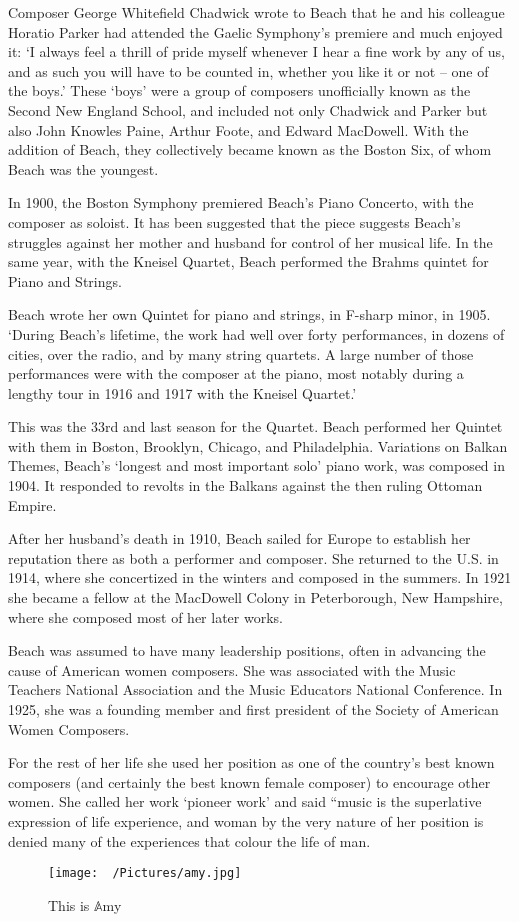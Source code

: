 \documentclass[12pt,a4paper]{article}
\begin{document}
Composer George Whitefield Chadwick wrote to Beach that he and his colleague Horatio Parker had attended the Gaelic Symphony's premiere and much enjoyed it:
`I always feel a thrill of pride myself whenever I hear a fine work by any of us, and as such you will have to be counted in, whether you like it or not – one of the boys.'
These `boys' were a group of composers unofficially known as the Second New England School, and included not only Chadwick and Parker but also John Knowles Paine,
Arthur Foote, and Edward MacDowell. With the addition of Beach, they collectively became known as the Boston Six, of whom Beach was the youngest.

In 1900, the Boston Symphony premiered Beach's Piano Concerto, with the composer as soloist.
It has been suggested that the piece suggests Beach's struggles against her mother and husband for control of her musical life.
In the same year, with the Kneisel Quartet, Beach performed the Brahms quintet for Piano and Strings.

Beach wrote her own Quintet for piano and strings, in F-sharp minor, in 1905. `During Beach's lifetime,
the work had well over forty performances, in dozens of cities, over the radio, and by many string quartets.
A large number of those performances were with the composer at the piano, most notably during a lengthy tour in 1916 and 1917 with the Kneisel Quartet.'

This was the 33rd and last season for the Quartet.
Beach performed her Quintet with them in Boston, Brooklyn, Chicago, and Philadelphia.
Variations on Balkan Themes, Beach's `longest and most important solo' piano work, was composed in 1904.
It responded to revolts in the Balkans against the then ruling Ottoman Empire.

After her husband's death in 1910, Beach sailed for Europe to establish her reputation there as both a performer and composer.
She returned to the U.S. in 1914, where she concertized in the winters and composed in the summers.
In 1921 she became a fellow at the MacDowell Colony in Peterborough, New Hampshire, where she composed most of her later works.

Beach was assumed to have many leadership positions, often in advancing the cause of American women composers.
She was associated with the Music Teachers National Association and the Music Educators National Conference.
In 1925, she was a founding member and first president of the Society of American Women Composers.

For the rest of her life she used her position as one of the country’s best known composers (and certainly the best known female composer) to encourage other women.
She called her work `pioneer work' and said “music is the superlative expression of life experience,
and woman by the very nature of her position is denied many of the experiences that colour the life of man.

\begin{figure}[h]
    \centering
\texttt{[image: ~/Pictures/amy.jpg]}
\caption{This is $\mathbb A$my}
\end{figure}
\end{document}
